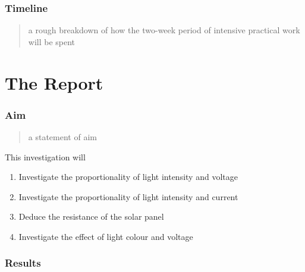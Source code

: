\documentclass{article}
\begin{document}
\section{Timeline}
\begin{quote}
a rough breakdown of how the two-week period of intensive practical work will be spent
\end{quote}
\pagebreak [4]
\part{The Report}

\section{Aim}
\begin{quote}
  a statement of aim
\end{quote}
This investigation will
\begin{enumerate}
  \item Investigate the proportionality of light intensity and voltage
  \item Investigate the proportionality of light intensity and current
  \item Deduce the resistance of the solar panel
  \item Investigate the effect of light colour and voltage
\end{enumerate}

\section{Results}
\end{document}
